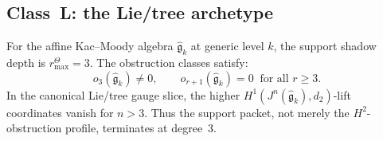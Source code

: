 
\subsection{Class~L: the Lie/tree archetype}

\begin{theorem}[$r^\Theta_{\max}(\widehat{\mathfrak{g}}_k) = 3$]
For the affine Kac--Moody algebra
$\widehat{\mathfrak{g}}_k$ at generic level $k$, the
support shadow depth is \(r^\Theta_{\max}=3\). The obstruction
classes satisfy:
\begin{equation}%
o_3(\widehat{\mathfrak{g}}_k) \neq 0,
\qquad
o_{r+1}(\widehat{\mathfrak{g}}_k) = 0
\;\;\text{for all } r \geq 3.
\end{equation}
In the canonical Lie/tree gauge slice, the higher
\(H^1(J^n(\widehat{\mathfrak g}_k),d_2)\)-lift coordinates vanish for
\(n>3\).  Thus the support packet, not merely the \(H^2\)-obstruction
profile, terminates at degree~\(3\).
\end{theorem}

